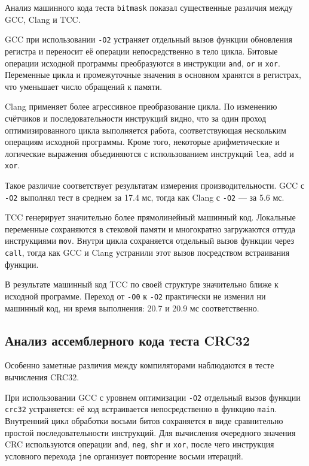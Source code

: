 \documentclass[12pt,a4paper]{article}
\begin{document}
Анализ машинного кода теста \texttt{bitmask} показал существенные различия между GCC, Clang и TCC.

GCC при использовании \texttt{-O2} устраняет отдельный вызов функции обновления регистра и переносит её операции непосредственно в тело цикла. Битовые операции исходной программы преобразуются в инструкции \texttt{and}, \texttt{or} и \texttt{xor}. Переменные цикла и промежуточные значения в основном хранятся в регистрах, что уменьшает число обращений к памяти.

Clang применяет более агрессивное преобразование цикла. По изменению счётчиков и последовательности инструкций видно, что за один проход оптимизированного цикла выполняется работа, соответствующая нескольким операциям исходной программы. Кроме того, некоторые арифметические и логические выражения объединяются с использованием инструкций \texttt{lea}, \texttt{add} и \texttt{xor}.

Такое различие соответствует результатам измерения производительности. GCC с \texttt{-O2} выполнял тест в среднем за 17.4 мс, тогда как Clang с \texttt{-O2} --- за 5.6 мс.

TCC генерирует значительно более прямолинейный машинный код. Локальные переменные сохраняются в стековой памяти и многократно загружаются оттуда инструкциями \texttt{mov}. Внутри цикла сохраняется отдельный вызов функции через \texttt{call}, тогда как GCC и Clang устранили этот вызов посредством встраивания функции.

В результате машинный код TCC по своей структуре значительно ближе к исходной программе. Переход от \texttt{-O0} к \texttt{-O2} практически не изменил ни машинный код, ни время выполнения: 20.7 и 20.9 мс соответственно.
\subsection{Анализ ассемблерного кода теста CRC32}
Особенно заметные различия между компиляторами наблюдаются в тесте вычисления CRC32.

При использовании GCC с уровнем оптимизации \texttt{-O2} отдельный вызов функции \texttt{crc32} устраняется: её код встраивается непосредственно в функцию \texttt{main}. Внутренний цикл обработки восьми битов сохраняется в виде сравнительно простой последовательности инструкций. Для вычисления очередного значения CRC используются операции \texttt{and}, \texttt{neg}, \texttt{shr} и \texttt{xor}, после чего инструкция условного перехода \texttt{jne} организует повторение восьми итераций.
\end{document}
